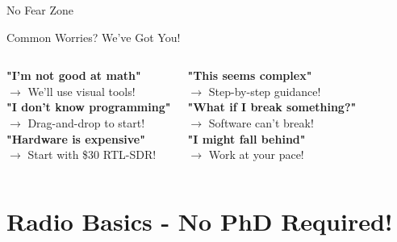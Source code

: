 \documentclass[aspectratio=169,11pt]{beamer}
\begin{document}
\begin{frame}{No Fear Zone}
\begin{center}
\Huge\textcolor{radiogreen}{Common Worries? We've Got You!}
\end{center}
\vspace{1em}
\begin{columns}
\textbf{"I'm not good at math"}\\
\textcolor{radioblue}{$\rightarrow$ We'll use visual tools!}\\[0.5em]

\textbf{"I don't know programming"}\\
\textcolor{radioblue}{$\rightarrow$ Drag-and-drop to start!}\\[0.5em]

\textbf{"Hardware is expensive"}\\
\textcolor{radioblue}{$\rightarrow$ Start with \$30 RTL-SDR!}

\textbf{"This seems complex"}\\
\textcolor{radiogreen}{$\rightarrow$ Step-by-step guidance!}\\[0.5em]

\textbf{"What if I break something?"}\\
\textcolor{radiogreen}{$\rightarrow$ Software can't break!}\\[0.5em]

\textbf{"I might fall behind"}\\
\textcolor{radiogreen}{$\rightarrow$ Work at your pace!}
\end{columns}
\vspace{1em}
\begin{center}
\end{center}
\end{frame}


\section{Radio Basics - No PhD Required!}
\end{document}
